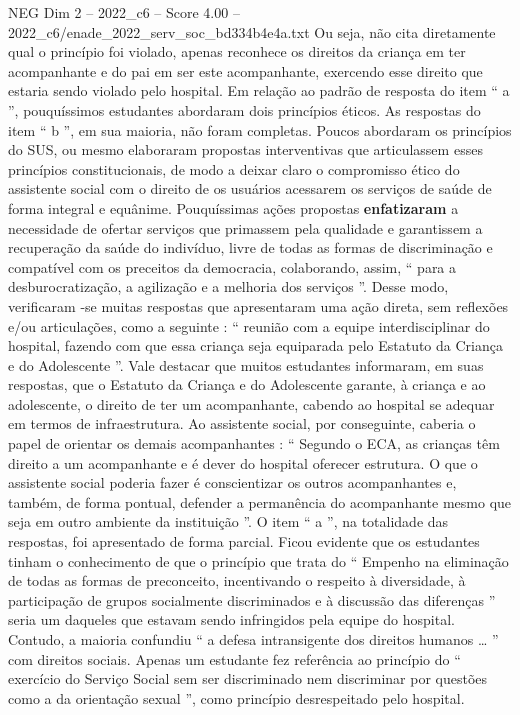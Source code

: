 \begin{textsample}{NEG Dim 2 – 2022\_c6 – Score 4.00 – 2022\_c6/enade\_2022\_serv\_soc\_bd334b4e4a.txt}
Ou seja, não cita diretamente qual o princípio foi violado, apenas reconhece os direitos da criança em ter acompanhante e do pai em ser este acompanhante, exercendo esse direito que estaria sendo violado pelo hospital.
Em relação ao padrão de resposta do item “ a ”, pouquíssimos estudantes abordaram dois princípios éticos.
As respostas do item “ b ”, em sua maioria, não foram completas.
Poucos abordaram os princípios do SUS, ou mesmo elaboraram propostas interventivas que articulassem esses princípios constitucionais, de modo a deixar claro o compromisso ético do assistente social com o direito de os usuários acessarem os serviços de saúde de forma integral e equânime.
Pouquíssimas ações propostas \textbf{enfatizaram} a necessidade de ofertar serviços que primassem pela qualidade e garantissem a recuperação da saúde do indivíduo, livre de todas as formas de discriminação e compatível com os preceitos da democracia, colaborando, assim, “ para a desburocratização, a agilização e a melhoria dos serviços ”.
Desse modo, verificaram -se muitas respostas que apresentaram uma ação direta, sem reflexões e/ou articulações, como a seguinte : “ reunião com a equipe interdisciplinar do hospital, fazendo com que essa criança seja equiparada pelo Estatuto da Criança e do Adolescente ”.
Vale destacar que muitos estudantes informaram, em suas respostas, que o Estatuto da Criança e do Adolescente garante, à criança e ao adolescente, o direito de ter um acompanhante, cabendo ao hospital se adequar em termos de infraestrutura.
Ao assistente social, por conseguinte, caberia o papel de orientar os demais acompanhantes : “ Segundo o ECA, as crianças têm direito a um acompanhante e é dever do hospital oferecer estrutura.
O que o assistente social poderia fazer é conscientizar os outros acompanhantes e, também, de forma pontual, defender a permanência do acompanhante mesmo que seja em outro ambiente da instituição ”.
O item “ a ”, na totalidade das respostas, foi apresentado de forma parcial.
Ficou evidente que os estudantes tinham o conhecimento de que o princípio que trata do “ Empenho na eliminação de todas as formas de preconceito, incentivando o respeito à diversidade, à participação de grupos socialmente discriminados e à discussão das diferenças ” seria um daqueles que estavam sendo infringidos pela equipe do hospital.
Contudo, a maioria confundiu “ a defesa intransigente dos direitos humanos … ” com direitos sociais.
Apenas um estudante fez referência ao princípio do “ exercício do Serviço Social sem ser discriminado nem discriminar por questões como a da orientação sexual ”, como princípio desrespeitado pelo hospital.

\end{textsample}
